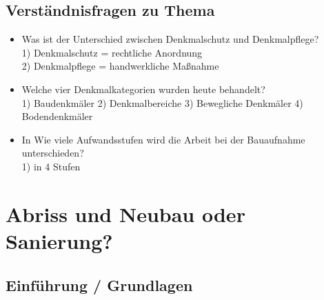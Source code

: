 \documentclass[fleqn,twoside,dvipsnames]{article}
\begin{document}
    \subsection{Verständnisfragen zu Thema}
        \begin{itemize}
            \item Was ist der Unterschied zwischen Denkmalschutz und Denkmalpflege?\\
            1) Denkmalschutz = rechtliche Anordnung\\
            2) Denkmalpflege = handwerkliche Maßnahme
            \item Welche vier Denkmalkategorien wurden heute behandelt?\\
            1) Baudenkmäler 2) Denkmalbereiche 3) Bewegliche Denkmäler
            4) Bodendenkmäler
            \item In Wie viele Aufwandsstufen wird die Arbeit bei der Bauaufnahme unterschieden?\\
            1) in 4 Stufen
        \end{itemize}

\newpage

\section{Abriss und Neubau oder Sanierung?} \label{Abbruch Sanierung}

    \subsection{Einführung / Grundlagen}
    
\end{document}
